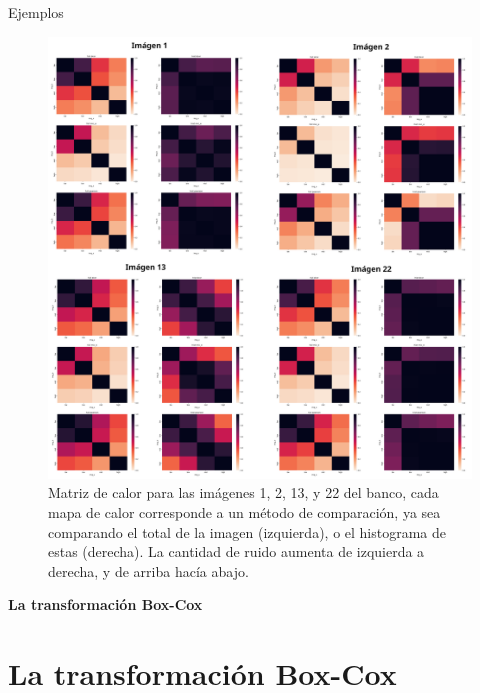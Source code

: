 \documentclass{beamer}
\begin{document}
\begin{frame}{Ejemplos}
    \begin{figure}[H]
        \centering
        \includegraphics[width=\textwidth]{heatmap_all.png}
        \caption{Matriz de calor para las im\'agenes 1, 2, 13, y 22 del banco, cada mapa de calor corresponde a un m\'etodo de comparaci\'on, ya sea comparando el total de la imagen (izquierda), o el histograma de estas (derecha). La cantidad de ruido aumenta de izquierda a derecha, y de arriba hacía abajo.}
        \label{fig:heatmapall}
    \end{figure}
\end{frame}

\begin{frame}
    \begin{center}
        {\LARGE\bf La transformación Box-Cox}
    \end{center}
\end{frame}

\section{La transformación Box-Cox}
\end{document}
